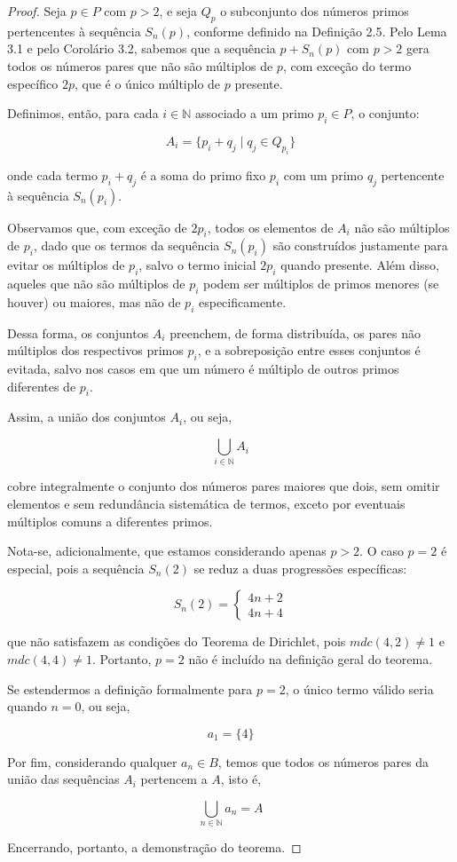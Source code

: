 \documentclass[a4paper,11pt]{article}
\theoremstyle{definition}
\theoremstyle{remark}
\begin{document}
	\begin{proof}
		Seja \(p \in P\) com \(p > 2\), e seja \(Q_p\) o subconjunto dos números primos pertencentes à sequência \(S_n(p)\), conforme definido na Definição 2.5. Pelo Lema 3.1 e pelo Corolário 3.2, sabemos que a sequência \(p + S_n(p)\) com \(p > 2\) gera todos os números pares que não são múltiplos de \(p\), com exceção do termo específico \(2p\), que é o único múltiplo de \(p\) presente.
		
		Definimos, então, para cada \(i \in \mathbb{N}\) associado a um primo \(p_i \in P\), o conjunto:
		
		\[
		A_i = \{p_i + q_j \mid q_j \in Q_{p_i}\}
		\]
		
		onde cada termo \(p_i + q_j\) é a soma do primo fixo \(p_i\) com um primo \(q_j\) pertencente à sequência \(S_n(p_i)\).
		
		Observamos que, com exceção de \(2p_i\), todos os elementos de \(A_i\) não são múltiplos de \(p_i\), dado que os termos da sequência \(S_n(p_i)\) são construídos justamente para evitar os múltiplos de \(p_i\), salvo o termo inicial \(2p_i\) quando presente. Além disso, aqueles que não são múltiplos de \(p_i\) podem ser múltiplos de primos menores (se houver) ou maiores, mas não de \(p_i\) especificamente.
		
		Dessa forma, os conjuntos \(A_i\) preenchem, de forma distribuída, os pares não múltiplos dos respectivos primos \(p_i\), e a sobreposição entre esses conjuntos é evitada, salvo nos casos em que um número é múltiplo de outros primos diferentes de \(p_i\).
		
		Assim, a união dos conjuntos \(A_i\), ou seja,
		
		\[
		\bigcup_{i \in \mathbb{N}} A_i
		\]
		
		cobre integralmente o conjunto dos números pares maiores que dois, sem omitir elementos e sem redundância sistemática de termos, exceto por eventuais múltiplos comuns a diferentes primos.
		
		Nota-se, adicionalmente, que estamos considerando apenas \(p > 2\). O caso \(p = 2\) é especial, pois a sequência \(S_n(2)\) se reduz a duas progressões específicas:
		
		\[
		S_n(2) =
		\begin{cases}
			4n + 2 \\
			4n + 4
		\end{cases}
		\]
		
		que não satisfazem as condições do Teorema de Dirichlet, pois \(mdc(4,2) \neq 1\) e \(mdc(4,4) \neq 1\). Portanto, \(p = 2\) não é incluído na definição geral do teorema.
		
		Se estendermos a definição formalmente para \(p = 2\), o único termo válido seria quando \(n = 0\), ou seja,
		
		\[
		a_1 = \{4\}
		\]
		
		Por fim, considerando qualquer \(a_n \in B\), temos que todos os números pares da união das sequências \(A_i\) pertencem a \(A\), isto é,
		
		\[
		\bigcup_{n \in \mathbb{N}} a_n = A
		\]
		
		Encerrando, portanto, a demonstração do teorema.
	\end{proof}
	
\end{document}

